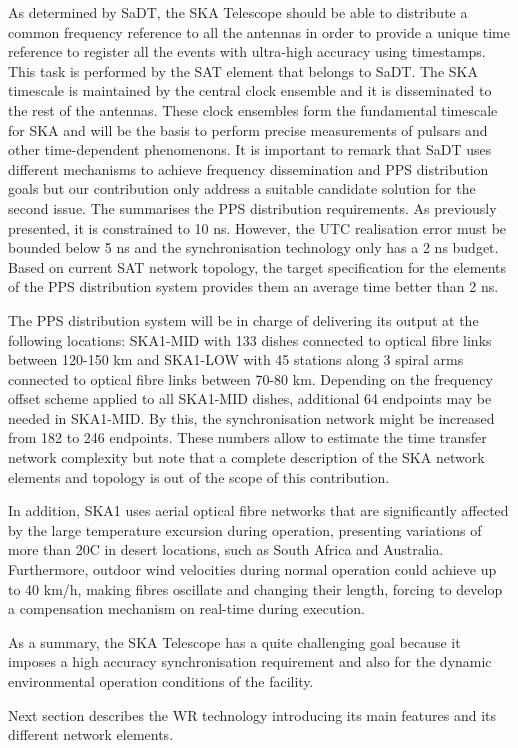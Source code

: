 As determined by SaDT, the SKA Telescope should be able to distribute a common frequency reference to all the antennas in order to provide a unique time reference to register all the events with ultra-high accuracy using timestamps. This task is performed by the SAT element that belongs to SaDT. The SKA timescale is maintained by the central clock ensemble and it is disseminated to the rest of the antennas. These clock ensembles form the fundamental timescale for SKA and will be the basis to perform precise measurements of pulsars and other time-dependent phenomenons. It is important to remark that SaDT uses different mechanisms to achieve frequency dissemination and PPS distribution goals but our contribution only address a suitable candidate solution for the second issue. 
The \cite{paultests} summarises the PPS distribution requirements. As previously presented, it is constrained to 10 ns. However, the UTC realisation error must be bounded below 5 ns and the synchronisation technology only has a 2 ns budget. Based on current SAT network topology, the target specification for the elements of the PPS distribution system provides them an average time better than 2 ns. 

The PPS distribution system will be in charge of delivering its output at the following locations: SKA1-MID with 133 dishes connected to optical fibre links between 120-150 km and SKA1-LOW with 45 stations along 3 spiral arms connected to optical fibre links between 70-80 km. Depending on the frequency offset scheme applied to all SKA1-MID dishes, additional 64 endpoints may be needed in SKA1-MID. By this, the synchronisation network might be increased from 182 to 246 endpoints. These numbers allow to estimate the time transfer network complexity but note that a complete description of the SKA network elements and topology is out of the scope of this contribution.

In addition, SKA1 uses aerial optical fibre networks that are
significantly affected by the large temperature excursion during operation,
presenting variations of more than 20\degree C in desert locations, such as South Africa and Australia. Furthermore, outdoor wind velocities during normal operation could achieve up to 40 km/h, making fibres oscillate and changing their length, forcing to develop a compensation mechanism on real-time during execution. 

As a summary, the SKA Telescope has a quite challenging goal because it imposes a high accuracy synchronisation requirement and also for the dynamic environmental operation conditions of the facility.

Next section describes the WR technology introducing its main features and its different network elements.